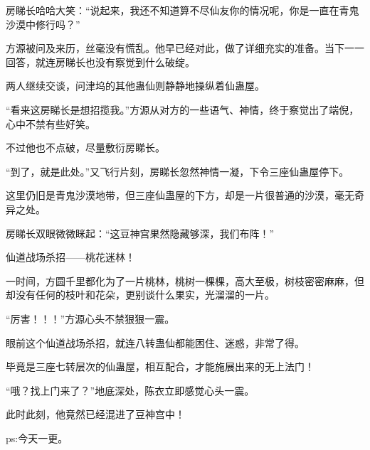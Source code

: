 \begin{this_body}
房睇长哈哈大笑：“说起来，我还不知道算不尽仙友你的情况呢，你是一直在青鬼沙漠中修行吗？”

方源被问及来历，丝毫没有慌乱。他早已经对此，做了详细充实的准备。当下一一回答，就连房睇长也没有察觉到什么破绽。

两人继续交谈，问津坞的其他蛊仙则静静地操纵着仙蛊屋。

“看来这房睇长是想招揽我。”方源从对方的一些语气、神情，终于察觉出了端倪，心中不禁有些好笑。

不过他也不点破，尽量敷衍房睇长。

“到了，就是此处。”又飞行片刻，房睇长忽然神情一凝，下令三座仙蛊屋停下。

这里仍旧是青鬼沙漠地带，但三座仙蛊屋的下方，却是一片很普通的沙漠，毫无奇异之处。

房睇长双眼微微眯起：“这豆神宫果然隐藏够深，我们布阵！”

仙道战场杀招——桃花迷林！

一时间，方圆千里都化为了一片桃林，桃树一棵棵，高大至极，树枝密密麻麻，但却没有任何的枝叶和花朵，更别谈什么果实，光溜溜的一片。

“厉害！！！”方源心头不禁狠狠一震。

眼前这个仙道战场杀招，就连八转蛊仙都能困住、迷惑，非常了得。

毕竟是三座七转层次的仙蛊屋，相互配合，才能施展出来的无上法门！

“哦？找上门来了？”地底深处，陈衣立即感觉心头一震。

此时此刻，他竟然已经混进了豆神宫中！

ps:今天一更。

\end{this_body}

